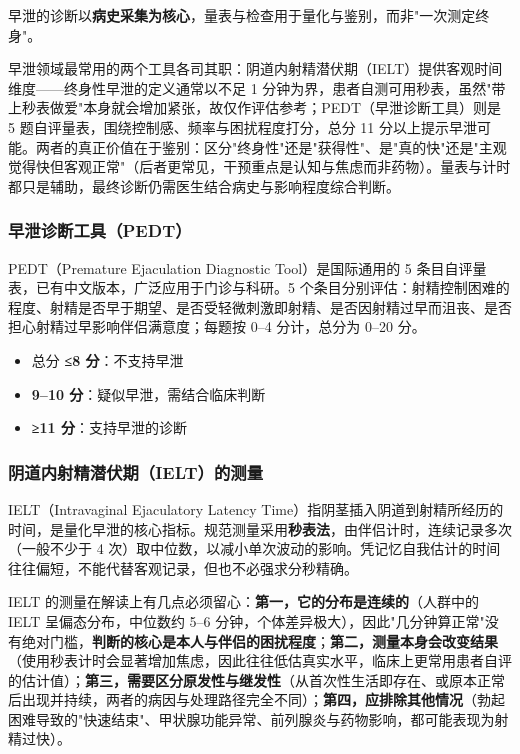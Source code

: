 早泄的诊断以\textbf{病史采集为核心}，量表与检查用于量化与鉴别，而非"一次测定终身"。


早泄领域最常用的两个工具各司其职：阴道内射精潜伏期（IELT）提供客观时间维度——终身性早泄的定义通常以不足 1 分钟为界，患者自测可用秒表，虽然"带上秒表做爱"本身就会增加紧张，故仅作评估参考；PEDT（早泄诊断工具）则是 5 题自评量表，围绕控制感、频率与困扰程度打分，总分 11 分以上提示早泄可能。两者的真正价值在于鉴别：区分"终身性"还是"获得性"、是"真的快"还是"主观觉得快但客观正常"（后者更常见，干预重点是认知与焦虑而非药物）。量表与计时都只是辅助，最终诊断仍需医生结合病史与影响程度综合判断。

\subsubsection{早泄诊断工具（PEDT）}

PEDT（Premature Ejaculation Diagnostic Tool）是国际通用的 5 条目自评量表，已有中文版本，广泛应用于门诊与科研。5 个条目分别评估：射精控制困难的程度、射精是否早于期望、是否受轻微刺激即射精、是否因射精过早而沮丧、是否担心射精过早影响伴侣满意度；每题按 0--4 分计，总分为 0--20 分。

\begin{itemize}
	\item 总分 \textbf{≤8 分}：不支持早泄
	\item \textbf{9--10 分}：疑似早泄，需结合临床判断
	\item \textbf{≥11 分}：支持早泄的诊断
\end{itemize}

\subsubsection{阴道内射精潜伏期（IELT）的测量}

IELT（Intravaginal Ejaculatory Latency Time）指阴茎插入阴道到射精所经历的时间，是量化早泄的核心指标。规范测量采用\textbf{秒表法}，由伴侣计时，连续记录多次（一般不少于 4 次）取中位数，以减小单次波动的影响。凭记忆自我估计的时间往往偏短，不能代替客观记录，但也不必强求分秒精确。


IELT 的测量在解读上有几点必须留心：\textbf{第一，它的分布是连续的}（人群中的 IELT 呈偏态分布，中位数约 5--6 分钟，个体差异极大），因此"几分钟算正常"没有绝对门槛，\textbf{判断的核心是本人与伴侣的困扰程度}；\textbf{第二，测量本身会改变结果}（使用秒表计时会显著增加焦虑，因此往往低估真实水平，临床上更常用患者自评的估计值）；\textbf{第三，需要区分原发性与继发性}（从首次性生活即存在、或原本正常后出现并持续，两者的病因与处理路径完全不同）；\textbf{第四，应排除其他情况}（勃起困难导致的"快速结束"、甲状腺功能异常、前列腺炎与药物影响，都可能表现为射精过快）。

